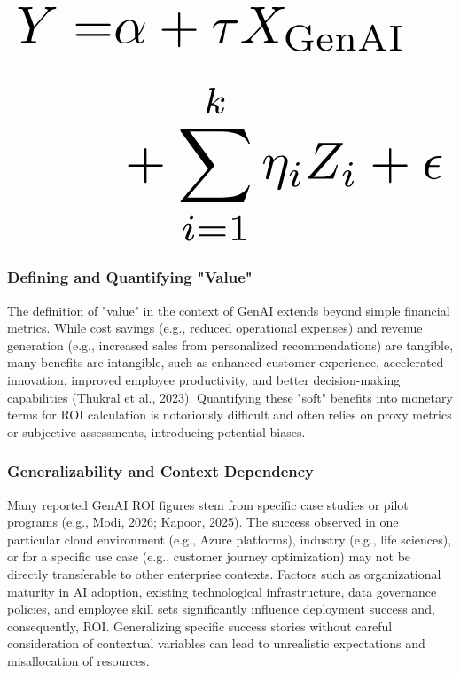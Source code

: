 \documentclass[10pt,twocolumn,letterpaper]{article}
\begin{document}
\begin{equation}
\resizebox{\columnwidth}{!}{$\displaystyle
\begin{aligned}
Y = & \alpha + \tau X_{\text{GenAI}} \\
& + \sum_{i=1}^k \eta_i Z_i + \epsilon
\end{aligned}
$}
\end{equation}














































\subsubsection{Defining and Quantifying "Value"}

The definition of "value" in the context of GenAI extends beyond simple financial metrics. While cost savings (e.g., reduced operational expenses) and revenue generation (e.g., increased sales from personalized recommendations) are tangible, many benefits are intangible, such as enhanced customer experience, accelerated innovation, improved employee productivity, and better decision-making capabilities (Thukral et al., 2023). Quantifying these "soft" benefits into monetary terms for ROI calculation is notoriously difficult and often relies on proxy metrics or subjective assessments, introducing potential biases.


\subsubsection{Generalizability and Context Dependency}

Many reported GenAI ROI figures stem from specific case studies or pilot programs (e.g., Modi, 2026; Kapoor, 2025). The success observed in one particular cloud environment (e.g., Azure platforms), industry (e.g., life sciences), or for a specific use case (e.g., customer journey optimization) may not be directly transferable to other enterprise contexts. Factors such as organizational maturity in AI adoption, existing technological infrastructure, data governance policies, and employee skill sets significantly influence deployment success and, consequently, ROI. Generalizing specific success stories without careful consideration of contextual variables can lead to unrealistic expectations and misallocation of resources.
\end{document}
